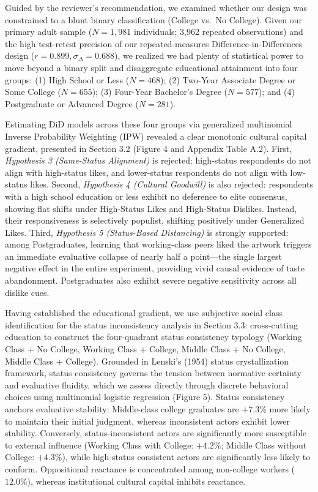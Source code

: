 \documentclass[11pt, letterpaper]{article}
\begin{document}
Guided by the reviewer's recommendation, we examined whether our design was constrained to a blunt binary classification (College vs.~No College). Given our primary adult sample ($N = 1,981$ individuals; 3,962 repeated observations) and the high test-retest precision of our repeated-measures Difference-in-Differences design ($r = 0.899, \sigma_{\Delta} = 0.688$), we realized we had plenty of statistical power to move beyond a binary split and disaggregate educational attainment into four groups: (1) High School or Less ($N = 468$); (2) Two-Year Associate Degree or Some College ($N = 655$); (3) Four-Year Bachelor's Degree ($N = 577$); and (4) Postgraduate or Advanced Degree ($N = 281$).

Estimating DiD models across these four groups via generalized multinomial Inverse Probability Weighting (IPW) revealed a clear monotonic cultural capital gradient, presented in Section 3.2 (Figure 4 and Appendix Table A.2). First, \textit{Hypothesis 3 (Same-Status Alignment)} is rejected: high-status respondents do not align with high-status likes, and lower-status respondents do not align with low-status likes. Second, \textit{Hypothesis 4 (Cultural Goodwill)} is also rejected: respondents with a high school education or less exhibit no deference to elite consensus, showing flat shifts under High-Status Likes and High-Status Dislikes. Instead, their responsiveness is selectively populist, shifting positively under Generalized Likes. Third, \textit{Hypothesis 5 (Status-Based Distancing)} is strongly supported: among Postgraduates, learning that working-class peers liked the artwork triggers an immediate evaluative collapse of nearly half a point---the single largest negative effect in the entire experiment, providing vivid causal evidence of taste abandonment. Postgraduates also exhibit severe negative sensitivity across all dislike cues. 

Having established the educational gradient, we use subjective social class identification for the status inconsistency analysis in Section 3.3: cross-cutting education to construct the four-quadrant status consistency typology (Working Class + No College, Working Class + College, Middle Class + No College, Middle Class + College). Grounded in Lenski's (1954) status crystallization framework, status consistency governs the tension between normative certainty and evaluative fluidity, which we assess directly through discrete behavioral choices using multinomial logistic regression (Figure 5). Status consistency anchors evaluative stability: Middle-class college graduates are $+7.3\%$ more likely to maintain their initial judgment, whereas inconsistent actors exhibit lower stability. Conversely, status-inconsistent actors are significantly more susceptible to external influence (Working Class with College: $+4.2\%$; Middle Class without College: $+4.3\%$), while high-status consistent actors are significantly less likely to conform. Oppositional reactance is concentrated among non-college workers ($12.0\%$), whereas institutional cultural capital inhibits reactance.
\end{document}
